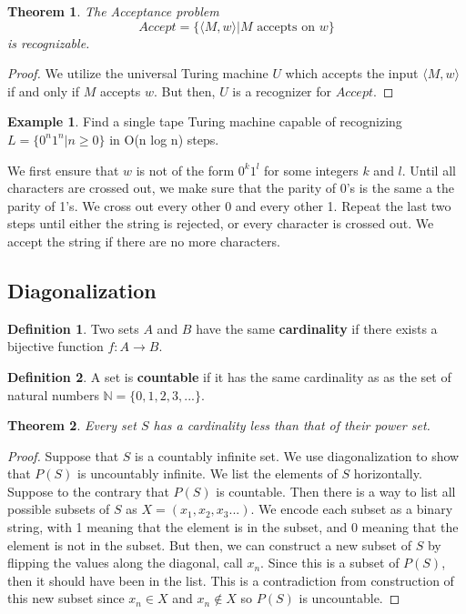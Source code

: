 \documentclass[11pt]{article}
\theoremstyle{plain} %
\newtheorem*{theorem}{Theorem}
\theoremstyle{definition}
\newtheorem*{definition}{Definition} %
\theoremstyle{example}
\newtheorem*{example}{Example}
\theoremstyle{remark}
\begin{document}
\begin{theorem}
The Acceptance problem 
$$Accept = \{ \langle M, w \rangle | M \text{ accepts on } w \} $$ is recognizable. 
\end{theorem}

\begin{proof}
We utilize the universal Turing machine $U$ which accepts the input $\langle M, w \rangle$ if and only if $M$ accepts $w$. But then, $U$ is a recognizer for $Accept$.
\end{proof}

\begin{example}
Find a single tape Turing machine capable of recognizing $L = \{ 0^n1^n | n \geq 0\}$ in O(n log n) steps.
\end{example}

We first ensure that $w$ is not of the form $0^k1^l$ for some integers $k$ and $l$. Until all characters are crossed out, we make sure that the parity of 0's is the same a the parity of 1's. We cross out every other 0 and every other 1. Repeat the last two steps until either the string is rejected, or every character is crossed out. We accept the string if there are no more characters. 

\subsection{Diagonalization}

\begin{definition}
Two sets $A$ and $B$ have the same \textbf{cardinality} if there exists a bijective function $f: A \rightarrow B$.
\end{definition}

\begin{definition}
A set is \textbf{countable} if it has the same cardinality as as the set of natural numbers $\mathbb N = \{0,1,2,3,...\}$.
\end{definition}

\begin{theorem}
Every set $S$ has a cardinality less than that of their power set. 
\end{theorem}

\begin{proof}
Suppose that $S$ is a countably infinite set. We use diagonalization to show that $P(S)$ is uncountably infinite. We list the elements of $S$ horizontally. Suppose to the contrary that $P(S)$ is countable. Then there is a way to list all possible subsets of $S$ as $X=(x_1, x_2, x_3...)$. We encode each subset as a binary string, with 1 meaning that the element is in the subset, and 0 meaning that the element is not in the subset. But then, we can construct a new subset of $S$ by flipping the values along the diagonal, call $x_n$. Since this is a subset of $P(S)$, then it should have been in the list. This is a contradiction from construction of this new subset since $x_n \in X$ and $x_n \not \in X$ so $P(S)$ is uncountable. 
\end{proof}
\end{document}
